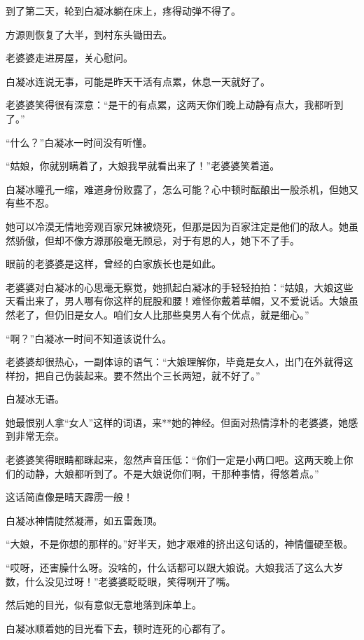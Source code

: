 
\begin{this_body}

到了第二天，轮到白凝冰躺在床上，疼得动弹不得了。

方源则恢复了大半，到村东头锄田去。

老婆婆走进房屋，关心慰问。

白凝冰连说无事，可能是昨天干活有点累，休息一天就好了。

老婆婆笑得很有深意：“是干的有点累，这两天你们晚上动静有点大，我都听到了。”

“什么？”白凝冰一时间没有听懂。

“姑娘，你就别瞒着了，大娘我早就看出来了！”老婆婆笑着道。

白凝冰瞳孔一缩，难道身份败露了，怎么可能？心中顿时酝酿出一股杀机，但她又有些不忍。

她可以冷漠无情地旁观百家兄妹被烧死，但那是因为百家注定是他们的敌人。她虽然骄傲，但却不像方源那般毫无顾忌，对于有恩的人，她下不了手。

眼前的老婆婆是这样，曾经的白家族长也是如此。

老婆婆对白凝冰的心思毫无察觉，她抓起白凝冰的手轻轻拍拍：“姑娘，大娘这些天看出来了，男人哪有你这样的屁股和腰！难怪你戴着草帽，又不爱说话。大娘虽然老了，但仍旧是女人。咱们女人比那些臭男人有个优点，就是细心。”

“啊？”白凝冰一时间不知道该说什么。

老婆婆却很热心，一副体谅的语气：“大娘理解你，毕竟是女人，出门在外就得这样扮，把自己伪装起来。要不然出个三长两短，就不好了。”

白凝冰无语。

她最恨别人拿“女人”这样的词语，来**她的神经。但面对热情淳朴的老婆婆，她感到非常无奈。

老婆婆笑得眼睛都眯起来，忽然声音压低：“你们一定是小两口吧。这两天晚上你们的动静，大娘都听到了。不是大娘说你们啊，干那种事情，得悠着点。”

这话简直像是晴天霹雳一般！

白凝冰神情陡然凝滞，如五雷轰顶。

“大娘，不是你想的那样的。”好半天，她才艰难的挤出这句话的，神情僵硬至极。

“哎呀，还害臊什么呀。没啥的，什么话都可以跟大娘说。大娘我活了这么大岁数，什么没见过呀！”老婆婆眨眨眼，笑得咧开了嘴。

然后她的目光，似有意似无意地落到床单上。

白凝冰顺着她的目光看下去，顿时连死的心都有了。


\end{this_body}
